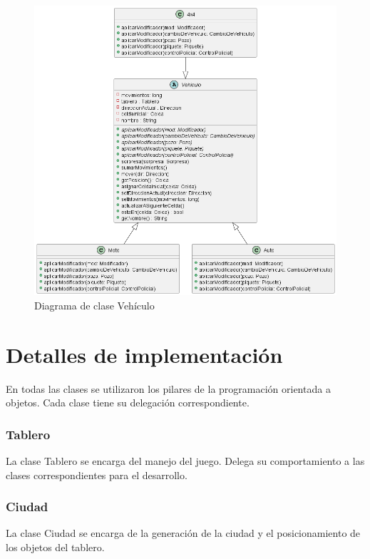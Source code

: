 \documentclass[titlepage,a4paper]{article}
\begin{document}
\begin{figure}[H]
  \centering
  \includegraphics[width=1\textwidth]{diagramas/interface-vehiculo.png}
  \caption{\label{fig:seq05} Diagrama de clase Vehículo}
\end{figure}


\section{Detalles de implementación}\label{sec:implementacion}

En todas las clases se utilizaron los pilares de la programación orientada a objetos. Cada clase tiene su delegación correspondiente.

\subsubsection[Tablero]{Tablero}

La clase Tablero se encarga del manejo del juego. Delega su comportamiento a las clases correspondientes para el desarrollo.

\subsubsection[Ciudad]{Ciudad}

La clase Ciudad se encarga de la generación de la ciudad y el posicionamiento de los objetos del tablero.
\end{document}
